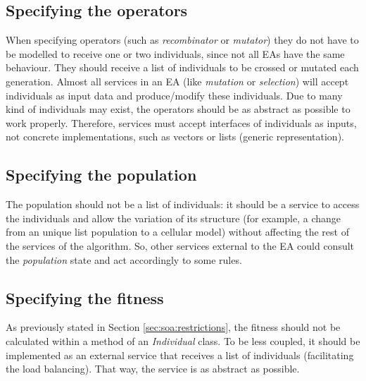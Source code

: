 \subsection{Specifying the operators}
When specifying operators (such as 
{\em recombinator} or {\em mutator}) they do not have to be modelled to receive one or two
individuals, since not all EAs have the same behaviour. They should receive a
list of individuals to be crossed or mutated each generation. Almost all services in an EA (like {\em mutation} or {\em selection}) will accept individuals as input data and produce/modify these individuals. Due to many kind of individuals may exist, the operators should be as abstract as possible to work properly. Therefore, services must accept interfaces of individuals as inputs, not concrete implementations, such as vectors or lists (generic representation). 

\subsection{Specifying the population} The population should not be a list of individuals: it should be a service
to access the individuals and allow the variation of its structure (for example, a change
from an unique list population to a cellular model) without
affecting  the rest of the services of the algorithm. So, other services
external to the EA could consult the {\em population} state and act
accordingly to some rules. 

\subsection{Specifying the fitness}
As previously stated in Section \ref{sec:soa:restrictions}, %
 the fitness should not be calculated within a method of an {\em Individual} class. To be less
coupled, it should be implemented as an external service that receives a list of individuals (facilitating the load balancing). That way, the service is as abstract as possible. 

